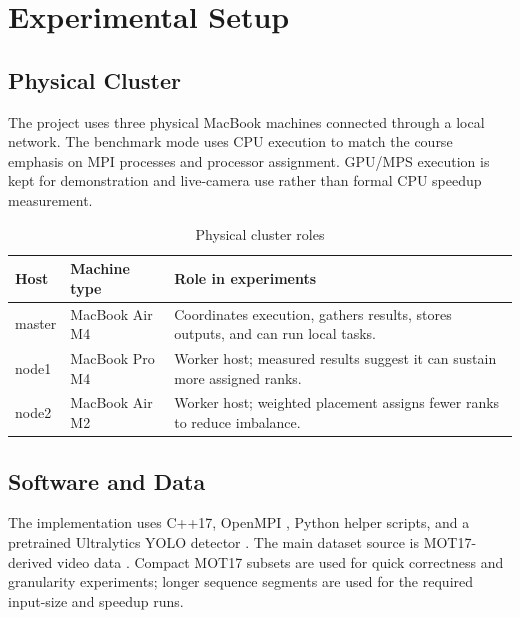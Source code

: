 \chapter{Experimental Setup}

\section{Physical Cluster}
The project uses three physical MacBook machines connected through a local network. The benchmark mode uses CPU execution to match the course emphasis on MPI processes and processor assignment. GPU/MPS execution is kept for demonstration and live-camera use rather than formal CPU speedup measurement.

\begin{table}[H]
\centering
\caption{Physical cluster roles}
\label{tab:hardware}
\begin{tabularx}{\textwidth}{L{2.2cm} L{3.0cm} X}
\toprule
Host & Machine type & Role in experiments \\
\midrule
master & MacBook Air M4 & Coordinates execution, gathers results, stores outputs, and can run local tasks. \\
node1 & MacBook Pro M4 & Worker host; measured results suggest it can sustain more assigned ranks. \\
node2 & MacBook Air M2 & Worker host; weighted placement assigns fewer ranks to reduce imbalance. \\
\bottomrule
\end{tabularx}
\end{table}

\section{Software and Data}
The implementation uses C++17, OpenMPI \cite{openmpi2026,mpiforum2023}, Python helper scripts, and a pretrained Ultralytics YOLO detector \cite{ultralytics2026}. The main dataset source is MOT17-derived video data \cite{motchallenge}. Compact MOT17 subsets are used for quick correctness and granularity experiments; longer sequence segments are used for the required input-size and speedup runs.

